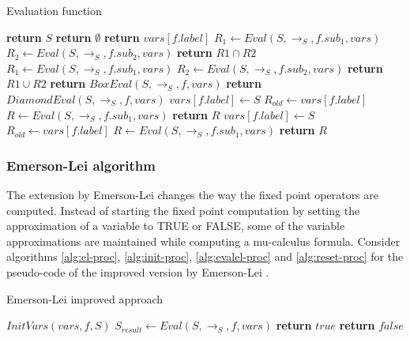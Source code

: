 \documentclass[10pt,a4paper]{article}
\begin{document}
\begin{algorithm}[H]
\caption{Evaluation function}\label{alg:eval-proc}
\begin{algorithmic}[1]
        	\State \textbf{return} $S$ 
			\State \textbf{return} $\emptyset$ 
			\State \textbf{return} $vars[f.label]$ 
        	\State $R_1 \gets Eval(S,\to_S,f.sub_1,vars)$ 
        	\State $R_2 \gets Eval(S,\to_S,f.sub_2,vars)$ 
			\State \textbf{return} $R1 \cap R2$ 
        	\State $R_1 \gets Eval(S,\to_S,f.sub_1,vars)$ 
        	\State $R_2 \gets Eval(S,\to_S,f.sub_2,vars)$ 
			\State \textbf{return} $R1 \cup R2$ 
			\State \textbf{return} $BoxEval(S,\to_S,f,vars)$ 
			\State \textbf{return} $DiamondEval(S,\to_S,f,vars)$ 
			\State $vars[f.label] \gets S$	
			\Repeat
				\State $R_{old} \gets vars[f.label]$
				\State $R \gets Eval(S,\to_S,f.sub_1,vars)$
			\State \textbf{return} $R$ 	
			\State $vars[f.label] \gets S$	
			\Repeat
				\State $R_{old} \gets vars[f.label]$
				\State $R \gets Eval(S,\to_S,f.sub_1,vars)$
			\State \textbf{return} $R$ 		
        \EndIf
	\EndProcedure
\end{algorithmic}
\end{algorithm}



\subsubsection{Emerson-Lei algorithm}
The extension by Emerson-Lei \cite{elpaper} changes the way the fixed point operators are computed. Instead of starting the fixed point computation by setting the approximation of a variable to TRUE or FALSE, some of the variable approximations are maintained while computing a mu-calculus formula. Consider algorithms \ref{alg:el-proc}, \ref{alg:init-proc}, \ref{alg:evalel-proc} and \ref{alg:reset-proc} for the pseudo-code of the improved version by Emerson-Lei \cite{elpaper}.

\begin{algorithm}[H]
\caption{Emerson-Lei improved approach}\label{alg:el-proc}
\begin{algorithmic}[1]
	\State $InitVars(vars,f,S)$ 
	\State $S_{result} \gets Eval(S, \to_S,f, vars)$
        	\State \textbf{return} $true$ 
        \Else
			\State \textbf{return} $false$ 
		\EndIf
	\EndProcedure
\end{algorithmic}
\end{algorithm}
\end{document}
